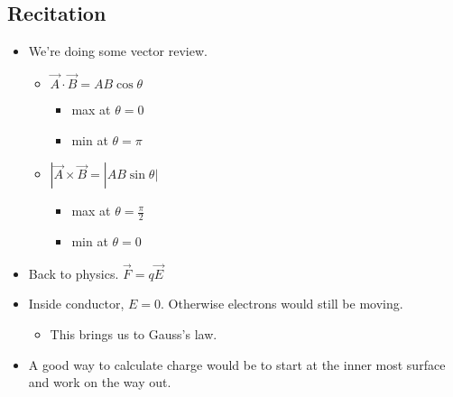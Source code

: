 \documentclass[11pt]{article}
\begin{document}
\subsection{Recitation}
\begin{itemize}
    \item We're doing some vector review.
    \begin{itemize}
        \item $\vec{A} \cdot \vec{B} = AB \cos \theta$
        \begin{itemize}
             \item max at $\theta = 0$
             \item min at $\theta = \pi$
         \end{itemize}
         \item $|\vec{A} \times \vec{B} = |AB \sin \theta|$
         \begin{itemize}
             \item max at $\theta = \frac{\pi}{2}$
             \item min at $\theta = 0$
         \end{itemize}
    \end{itemize}

    \item Back to physics. $\vec{F} = q \vec{E}$
    \item Inside conductor, $E = 0$. Otherwise electrons would still be moving.
    \begin{itemize}
        \item This brings us to Gauss's law.
    \end{itemize}

    \item A good way to calculate charge would be to start at the inner most surface and work on the way out.
\end{itemize}
\end{document}
